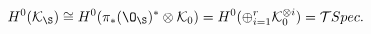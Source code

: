 \begin{equation}\label{ide1}
H^0(\mathcal{K}_\S)\cong H^0(\pi_*(\O_\S)^*\otimes \mathcal{K}_0)=
H^0(\oplus_{i=1}^r\mathcal{K}_0^{\otimes i})=\mathcal{T}Spec.
\end{equation}

